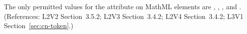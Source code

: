 The only permitted values for the  attribute on MathML
 elements are , , , and
.  (References: L2V2 Section~3.5.2; L2V3 Section~3.4.2;
L2V4 Section~3.4.2; L3V1 Section~\ref{sec:cn-token}.)
